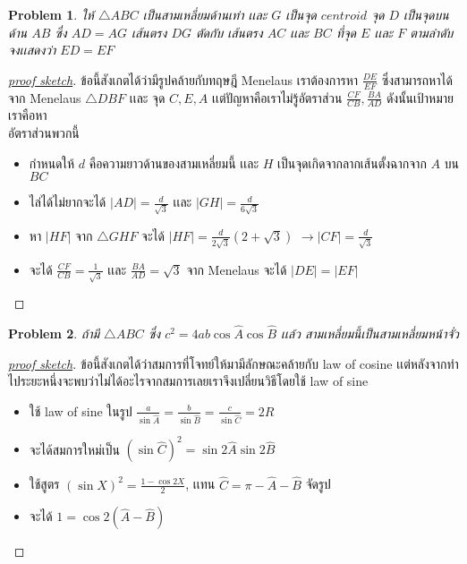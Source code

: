 \documentclass[a4paper,12pt]{article}
\newtheorem{problem}{Problem}[section]
\begin{document}
		\begin{problem}
			ให้ $\bigtriangleup{ABC}$ เป็นสามเหลี่ยมด้านเท่า เเละ $G$ เป็นจุด $centroid$ จุด $D$ เป็นจุดบนด้าน $AB$ ซึ่ง $AD = AG$ เส้นตรง $DG$ ตัดกับ เส้นตรง $AC$ เเละ $BC$ ที่จุด $E$ เเละ $F$ ตามลำดับ จงเเสดงว่า $ED=EF$ 
		\end{problem}
		\begin{proof}[\underline{proof sketch}]
			ข้อนี้สังเกตได้ว่ามีรูปคล้ายกับทฤษฎี Menelaus เราต้องการหา $\frac{DE}{EF}$ ซึ่งสามารถหาได้จาก Menelaus $\bigtriangleup{DBF}$ เเละ จุด $C, E, A$ เเต่ปัญหาคือเราไม่รู้อัตราส่วน $\frac{CF}{CB}, \frac{BA}{AD}$ ดังนั้นเป้าหมายเราคือหา\\อัตราส่วนพวกนี้
			\begin{itemize}
				\item กำหนดให้ $d$ คือความยาวด้านของสามเหลี่ยมนี้ เเละ $H$ เป็นจุดเกิดจากลากเส้นตั้งฉากจาก $A$ บน $BC$
				\item ไล่ได้ไม่ยากจะได้ $|AD| = \frac{d}{\sqrt{3}}$ เเละ $|GH| = \frac{d}{6\sqrt{3}}$
				\item หา $|HF|$ จาก $\bigtriangleup{GHF}$ จะได้ $|HF| = \frac{d}{2\sqrt{3}}(2+\sqrt{3})$ $\rightarrow |CF| = \frac{d}{\sqrt{3}}$
				\item จะได้ $\frac{CF}{CB} =  \frac{1}{\sqrt{3}} $ เเละ $\frac{BA}{AD} = \sqrt{3}$ จาก Menelaus จะได้ $|DE| = |EF|$
			\end{itemize}
		\end{proof}
	\newpage		
		\begin{problem}
			ถ้ามี $\bigtriangleup{ABC}$ ซึ่ง $c^2 = 4ab\cos{\hat{A}}\cos{\hat{B}} $ เเล้ว สามเหลี่ยมนี้เป็นสามเหลี่ยมหน้าจั่ว
		\end{problem}
		\begin{proof}[\underline{proof sketch}]
			ข้อนี้สังเกตได้ว่าสมการที่โจทย์ให้มามีลักษณะคล้ายกับ law of cosine เเต่หลังจากทำไประยะหนึ่งจะพบว่าไม่ได้อะไรจากสมการเลยเราจึงเปลี่ยนวิธีโดยใช้ law of sine
			\begin{itemize}
				\item ใช้ law of sine ในรูป $\frac{a}{\sin{\hat{A}}} = \frac{b}{\sin{\hat{B}}} = \frac{c}{\sin{\hat{C}}} = 2R$
				\item จะได้สมการใหม่เป็น $(\sin{\hat{C}})^2 = \sin{2\hat{A}}\sin{2\hat{B}}$
				\item ใช้สูตร $(\sin{X})^2= \frac{1 - \cos{2X}}{2}$, 	เเทน $\hat{C} = \pi - \hat{A} - \hat{B}$ จัดรูป
				\item จะได้ $1 = \cos{2(\hat{A}-\hat{B})}$
			\end{itemize}
			
		\end{proof}
\end{document}
